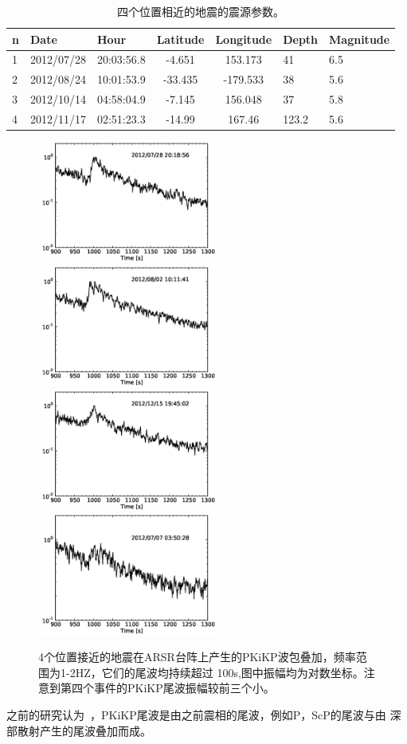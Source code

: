 \begin{table}[!ht]
\centering
\begin{tabular}{*{3}{l}*{2}{c}*{2}{l}}
\hline
n & Date & Hour & Latitude & Longitude & Depth & Magnitude\\
\hline
1 & 2012/07/28 & 20:03:56.8 &  -4.651  &  153.173  &  41  & 6.5\\
2 & 2012/08/24 & 10:01:53.9 & -33.435  & -179.533  &  38  & 5.6\\
3 & 2012/10/14 & 04:58:04.9 &  -7.145  &  156.048  &  37  & 5.8\\
4 & 2012/11/17 & 02:51:23.3 & -14.99  &  167.46  &  123.2 & 5.6\\
\hline
\end{tabular}
\caption{四个位置相近的地震的震源参数。}
\label{evtlst1}
\end{table}

\begin{figure}[tbph]
	\centering
	\includegraphics[width=6cm,height=4cm]{fig/chap3/3344573_coda.eps}
	\hspace{2em}
	\includegraphics[width=6cm,height=4cm]{fig/chap3/3347700_coda.eps}\\
	\includegraphics[width=6cm,height=4cm]{fig/chap3/3712078_coda.eps}
	\hspace{2em}
	\includegraphics[width=6cm,height=4cm]{fig/chap3/3343509_coda.eps}
	\caption{4个位置接近的地震在ARSR台阵上产生的PKiKP波包叠加，频率范围为1-2HZ，它们的尾波均持续超过%
100s,图中振幅均为对数坐标。注意到第四个事件的PKiKP尾波振幅较前三个小。}
\end{figure}

之前的研究认为~\citep{Koper2004,Poupinet2004}，PKiKP尾波是由之前震相的尾波，例如P，ScP的尾波与由
深部散射产生的尾波叠加而成。